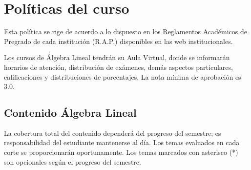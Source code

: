 \chapter{Políticas del curso}

\noindent{}

Esta política se rige de acuerdo a lo dispuesto en los Reglamentos Académicos de Pregrado de cada institución (R.A.P.) disponibles en las web institucionales.

Los cursos de Álgebra Lineal tendrán su Aula Virtual, donde se informarán horarios de atención, distribución de exámenes, demás aspectos particulares, calificaciones y distribuciones de porcentajes. La nota mínima de aprobación es 3.0.

\section{Contenido Álgebra Lineal} 

La cobertura total del contenido dependerá del progreso del semestre; es responsabilidad del estudiante mantenerse al día. Los temas evaluados en cada corte se proporcionarán oportunamente. Los temas marcados con asterisco (*) son opcionales según el progreso del semestre.

